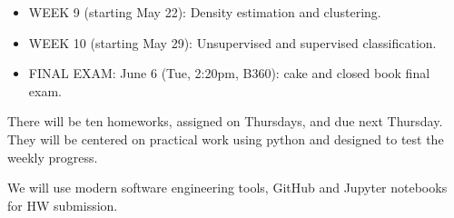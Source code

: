 \documentclass[10pt]{article}
\begin{document}
\begin{itemize}
\item WEEK  9 (starting May 22):  Density estimation and clustering.

\item WEEK  10 (starting May 29):  Unsupervised and supervised classification.

\item FINAL EXAM: June 6 (Tue, 2:20pm, B360): cake and closed book final exam.

\end{itemize}


\vskip 0.2in


There will be ten homeworks, assigned on Thursdays, and due next Thursday. They will
be centered on practical work using python and designed to test the weekly progress. 

We will use modern software engineering tools, GitHub and Jupyter notebooks for HW submission. 
\end{document}
